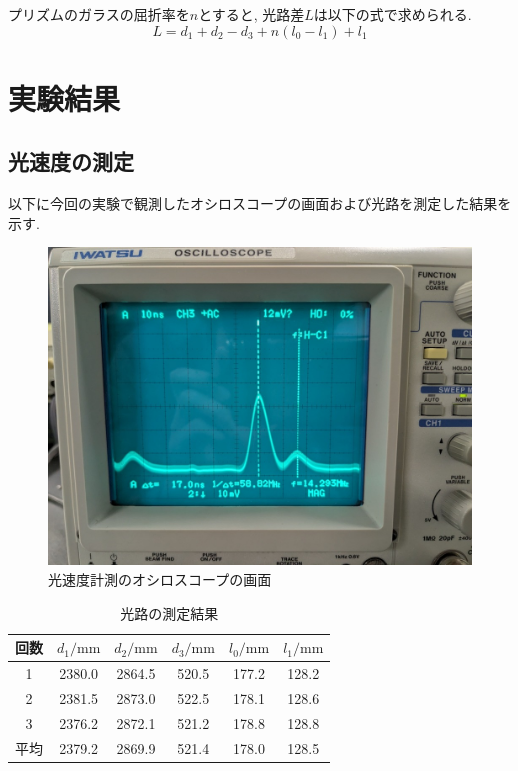 \documentclass{jarticle}
\begin{document}
プリズムのガラスの屈折率を$n$とすると, 光路差$L$は以下の式で求められる.
\begin{equation}
  \label{eq:L}
  L=d_1+d_2-d_3+n(l_0-l_1)+l_1
\end{equation}



\section{実験結果}


\subsection{光速度の測定}

以下に今回の実験で観測したオシロスコープの画面および光路を測定した結果を示す.

\begin{figure}[H]
  \begin{center}
    \includegraphics[scale=0.3]{lightspeed_result_picture.jpg}
    \caption{光速度計測のオシロスコープの画面}
  \end{center}
\end{figure}

\begin{table}[h]
  \centering
  \caption{光路の測定結果}
  \begin{tabular}{cccccc}
    \hline
    回数 & $d_1/\mathrm{mm}$ & $d_2/\mathrm{mm}$ & $d_3/\mathrm{mm}$ & $l_0/\mathrm{mm}$ & $l_1/\mathrm{mm}$ \\
    \hline
    1 & 2380.0 & 2864.5 & 520.5 & 177.2 & 128.2 \\
    2 & 2381.5 & 2873.0 & 522.5 & 178.1 & 128.6 \\
    3 & 2376.2 & 2872.1 & 521.2 & 178.8 & 128.8 \\
    \hline
    平均 & 2379.2 & 2869.9 & 521.4 & 178.0 & 128.5 \\
    \hline
  \end{tabular}
\end{table}
\end{document}
